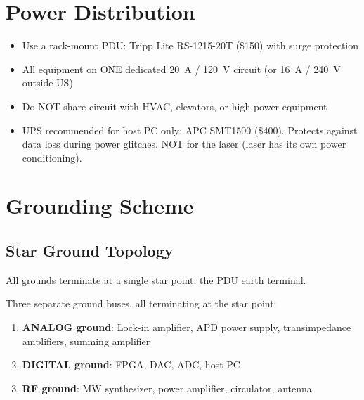 \documentclass[11pt,a4paper,openany]{book}
\begin{document}
\section{Power Distribution}

\begin{itemize}[nosep]
  \item Use a rack-mount PDU: Tripp Lite RS-1215-20T (\$150) with surge protection
  \item All equipment on ONE dedicated 20~A / 120~V circuit (or 16~A / 240~V outside US)
  \item Do NOT share circuit with HVAC, elevators, or high-power equipment
  \item UPS recommended for host PC only: APC SMT1500 (\$400). Protects against data loss during power glitches. NOT for the laser (laser has its own power conditioning).
\end{itemize}

\section{Grounding Scheme}


\subsection{Star Ground Topology}

All grounds terminate at a single star point: the PDU earth terminal.

\noindent
Three separate ground buses, all terminating at the star point:

\begin{enumerate}[nosep]
  \item \textbf{ANALOG ground}: Lock-in amplifier, APD power supply, transimpedance amplifiers, summing amplifier
  \item \textbf{DIGITAL ground}: FPGA, DAC, ADC, host PC
  \item \textbf{RF ground}: MW synthesizer, power amplifier, circulator, antenna
\end{enumerate}
\end{document}
